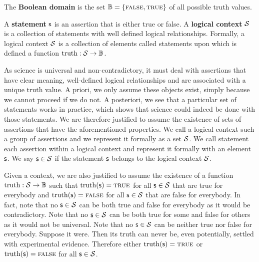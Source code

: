 \documentclass[11pt,letterpaper,fleqn]{memoir} %
\begin{document}
\begin{mathSection}
\begin{defn}
	The \textbf{Boolean domain} is the set $\mathbb{B} = \{\textsc{false}, \textsc{true}\}$ of all possible truth values.
\end{defn}


\begin{axiom}\label{ax_statement}
	A \textbf{statement} $\mathsf{s}$ is an assertion that is either true or false. A \textbf{logical context} $\mathcal{S}$ is a collection of statements with well defined logical relationships. Formally, a logical context $\mathcal{S}$ is a collection of elements called statements upon which is defined a function $\operatorname{truth}: \mathcal{S} \to \mathbb{B}$.
\end{axiom}

\begin{justification}
	As science is universal and non-contradictory, it must deal with assertions that have clear meaning, well-defined logical relationships and are associated with a unique truth value. A priori, we only assume these objects exist, simply because we cannot proceed if we do not. A posteriori, we see that a particular set of statements works in practice, which shows that science could indeed be done with those statements. We are therefore justified to assume the existence of sets of assertions that have the aforementioned properties. We call a logical context such a group of assertions and we represent it formally as a set $\mathcal{S}$. We call statement each assertion within a logical context and represent it formally with an element $\mathsf{s}$. We say $\mathsf{s} \in \mathcal{S}$ if the statement $\mathsf{s}$ belongs to the logical context $\mathcal{S}$.
	
	Given a context, we are also justified to assume the existence of a function $\operatorname{truth} : \mathcal{S} \to \mathbb{B}$ such that $\operatorname{truth}(\mathsf{s}) = \textsc{true}$ for all $\mathsf{s} \in \mathcal{S}$ that are true for everybody and $\operatorname{truth}(\mathsf{s}) = \textsc{false}$ for all $\mathsf{s} \in \mathcal{S}$ that are false for everybody. In fact, note that no $\mathsf{s} \in \mathcal{S}$ can be both true and false for everybody as it would be contradictory. Note that no $\mathsf{s} \in \mathcal{S}$ can be both true for some and false for others as it would not be universal. Note that no $\mathsf{s} \in \mathcal{S}$ can be neither true nor false for everybody. Suppose it were. Then its truth can never be, even potentially, settled with experimental evidence. Therefore either $\operatorname{truth}(\mathsf{s}) = \textsc{true}$ or $\operatorname{truth}(\mathsf{s}) = \textsc{false}$ for all $\mathsf{s} \in \mathcal{S}$.


\end{justification}
\end{mathSection}
\end{document}
